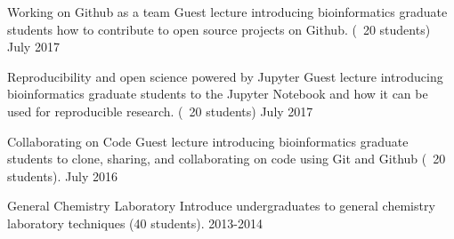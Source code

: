 
\begin{cvteaching}


  \cvteach
    {Working on Github as a team}
    {Guest lecture introducing bioinformatics graduate students how to contribute to open source projects on Github. (~20 students)}
    {July 2017}

  \cvteach
    {Reproducibility and open science powered by Jupyter}
    {Guest lecture introducing bioinformatics graduate students to the Jupyter Notebook and how it can be used for reproducible research. (~20 students)}
    {July 2017}

  \cvteach
    {Collaborating on Code}
    {Guest lecture introducing bioinformatics graduate students to clone, sharing, and collaborating on code using Git and Github (~20 students).}
    {July 2016}

  \cvteach
    {General Chemistry Laboratory}
    {Introduce undergraduates to general chemistry laboratory techniques (40 students).}
    {2013-2014}

\end{cvteaching}
